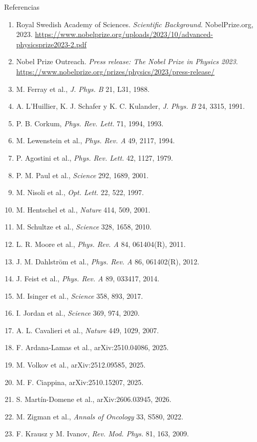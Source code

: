 \documentclass[aspectratio=169,11pt]{beamer}
\begin{document}
\begin{frame}{Referencias}
\tiny
\begin{enumerate}
\item Royal Swedish Academy of Sciences. \textit{Scientific Background}. NobelPrize.org, 2023. \url{https://www.nobelprize.org/uploads/2023/10/advanced-physicsprize2023-2.pdf}
\item Nobel Prize Outreach. \textit{Press release: The Nobel Prize in Physics 2023}. \url{https://www.nobelprize.org/prizes/physics/2023/press-release/}
\item M. Ferray et al., \textit{J. Phys. B} 21, L31, 1988.
\item A. L'Huillier, K. J. Schafer y K. C. Kulander, \textit{J. Phys. B} 24, 3315, 1991.
\item P. B. Corkum, \textit{Phys. Rev. Lett.} 71, 1994, 1993.
\item M. Lewenstein et al., \textit{Phys. Rev. A} 49, 2117, 1994.
\item P. Agostini et al., \textit{Phys. Rev. Lett.} 42, 1127, 1979.
\item P. M. Paul et al., \textit{Science} 292, 1689, 2001.
\item M. Nisoli et al., \textit{Opt. Lett.} 22, 522, 1997.
\item M. Hentschel et al., \textit{Nature} 414, 509, 2001.
\item M. Schultze et al., \textit{Science} 328, 1658, 2010.
\item L. R. Moore et al., \textit{Phys. Rev. A} 84, 061404(R), 2011.
\item J. M. Dahlström et al., \textit{Phys. Rev. A} 86, 061402(R), 2012.
\item J. Feist et al., \textit{Phys. Rev. A} 89, 033417, 2014.
\item M. Isinger et al., \textit{Science} 358, 893, 2017.
\item I. Jordan et al., \textit{Science} 369, 974, 2020.
\item A. L. Cavalieri et al., \textit{Nature} 449, 1029, 2007.
\item F. Ardana-Lamas et al., arXiv:2510.04086, 2025.
\item M. Volkov et al., arXiv:2512.09585, 2025.
\item M. F. Ciappina, arXiv:2510.15207, 2025.
\item S. Martín-Domene et al., arXiv:2606.03945, 2026.
\item M. Zigman et al., \textit{Annals of Oncology} 33, S580, 2022.
\item F. Krausz y M. Ivanov, \textit{Rev. Mod. Phys.} 81, 163, 2009.
\end{enumerate}
\end{frame}
\end{document}
